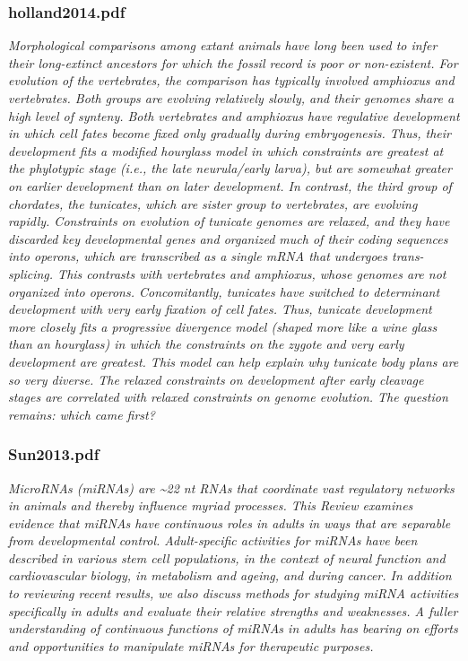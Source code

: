 \documentclass[graybox]{svmult}
\begin{document}
\subsubsection{holland2014.pdf}
\cite{Holland2015} \textit{
Morphological comparisons among extant animals have long been used to infer 
their long-extinct ancestors for which the fossil record is poor or 
non-existent. For evolution of the vertebrates, the comparison has typically 
involved amphioxus and vertebrates. Both groups are evolving relatively slowly, 
and their genomes share a high level of synteny. Both vertebrates and amphioxus 
have regulative development in which cell fates become fixed only gradually 
during embryogenesis. Thus, their development fits a modified hourglass model in 
which constraints are greatest at the phylotypic stage (i.e., the late 
neurula/early larva), but are somewhat greater on earlier development than on 
later development. In contrast, the third group of chordates, the tunicates, 
which are sister group to vertebrates, are evolving rapidly. Constraints on 
evolution of tunicate genomes are relaxed, and they have discarded key 
developmental genes and organized much of their coding sequences into operons, 
which are transcribed as a single mRNA that undergoes trans-splicing. This 
contrasts with vertebrates and amphioxus, whose genomes are not organized into 
operons. Concomitantly, tunicates have switched to determinant development with 
very early fixation of cell fates. Thus, tunicate development more closely fits 
a progressive divergence model (shaped more like a wine glass than an hourglass) 
in which the constraints on the zygote and very early development are greatest. 
This model can help explain why tunicate body plans are so very diverse. The 
relaxed constraints on development after early cleavage stages are correlated 
with relaxed constraints on genome evolution. The question remains: which came 
first?}
\subsubsection{Sun2013.pdf}

\cite{Sun2013}
\textit{MicroRNAs (miRNAs) are {\~{}}22 nt RNAs that coordinate vast regulatory 
networks in animals and thereby influence myriad processes. This Review examines 
evidence that miRNAs have continuous roles in adults in ways that are separable 
from developmental control. Adult-specific activities for miRNAs have been 
described in various stem cell populations, in the context of neural function 
and cardiovascular biology, in metabolism and ageing, and during cancer. In 
addition to reviewing recent results, we also discuss methods for studying miRNA 
activities specifically in adults and evaluate their relative strengths and 
weaknesses. A fuller understanding of continuous functions of miRNAs in adults 
has bearing on efforts and opportunities to manipulate miRNAs for therapeutic 
purposes.}
\end{document}
